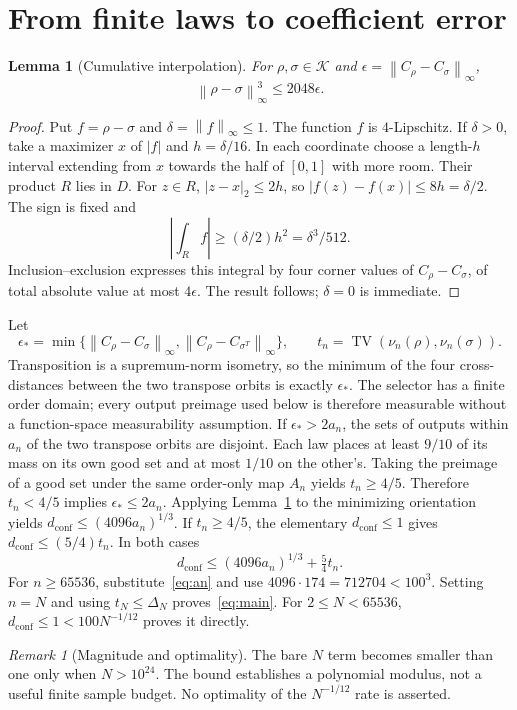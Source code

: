 \documentclass[11pt]{article}
\newtheorem{lemma}[theorem]{Lemma}
\theoremstyle{remark}
\newtheorem{remark}[theorem]{Remark}
\newcommand{\K}{\mathcal K}
\newcommand{\TV}{\operatorname{TV}}
\newcommand{\dc}{d_{\mathrm{conf}}}
\newcommand{\norm}[1]{\left\lVert #1\right\rVert_\infty}
\begin{document}
\section{From finite laws to coefficient error}\label{sec:inverse}
\begin{lemma}[Cumulative interpolation]\label{lem:interpolation}
For $\rho,\sigma\in\K$ and $\epsilon=\norm{C_\rho-C_\sigma}$,
\[
 \norm{\rho-\sigma}^3\le2048\epsilon.
\]
\end{lemma}
\begin{proof}
Put $f=\rho-\sigma$ and $\delta=\norm f\le1$. The function $f$ is
$4$-Lipschitz. If $\delta>0$, take a maximizer $x$ of $|f|$ and
$h=\delta/16$. In each coordinate choose a length-$h$ interval
extending from $x$ towards the half of $[0,1]$ with more room.
Their product $R$ lies in $D$. For $z\in R$,
$|z-x|_2\le2h$, so $|f(z)-f(x)|\le8h=\delta/2$.
The sign is fixed and
\[
 \left|\int_R f\right|\ge(\delta/2)h^2=\delta^3/512.
\]
Inclusion--exclusion expresses this integral by four corner values
of $C_\rho-C_\sigma$, of total absolute value at most $4\epsilon$.
The result follows; $\delta=0$ is immediate.
\end{proof}

Let
\[
 \epsilon_* =\min\{\norm{C_\rho-C_\sigma},
                         \norm{C_\rho-C_{\sigma^T}}\},\qquad
 t_n=\TV(\nu_n(\rho),\nu_n(\sigma)).
\]
Transposition is a supremum-norm isometry, so the minimum of the four
cross-distances between the two transpose orbits is exactly $\epsilon_*$.
The selector has a finite order domain; every output preimage used below
is therefore measurable without a function-space measurability assumption.
If $\epsilon_*>2a_n$, the sets of outputs within $a_n$ of the two
transpose orbits are disjoint. Each law places at least $9/10$ of
its mass on its own good set and at most $1/10$ on the other's.
Taking the preimage of a good set under the same order-only map
$A_n$ yields $t_n\ge4/5$. Therefore $t_n<4/5$ implies
$\epsilon_*\le2a_n$. Applying Lemma~\ref{lem:interpolation} to
the minimizing orientation yields
$\dc\le(4096a_n)^{1/3}$. If $t_n\ge4/5$, the elementary
$\dc\le1$ gives $\dc\le(5/4)t_n$. In both cases
\[
 \dc\le(4096a_n)^{1/3}+\tfrac54t_n.
\]
For $n\ge65536$, substitute~\eqref{eq:an} and use
$4096\cdot174=712704<100^3$. Setting $n=N$ and using
$t_N\le\Delta_N$ proves~\eqref{eq:main}. For $2\le N<65536$,
$\dc\le1<100N^{-1/12}$ proves it directly.

\begin{remark}[Magnitude and optimality]
The bare $N$ term becomes smaller than one only when $N>10^{24}$.
The bound establishes a polynomial modulus, not a useful finite sample
budget. No optimality of the $N^{-1/12}$ rate is asserted.
\end{remark}
\end{document}
